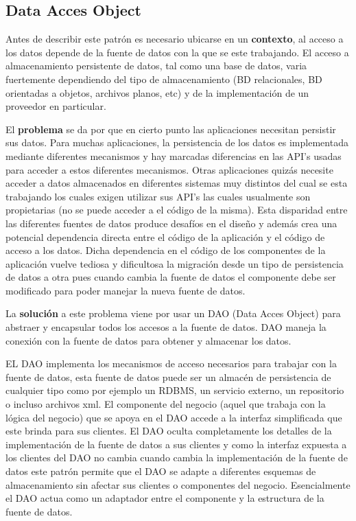 \subsection{Data Acces Object}\label{jdbgm:dao}
Antes de describir este patrón es necesario ubicarse en un \textbf{contexto}, al acceso a los datos depende de la fuente de datos con la que se este trabajando. El acceso a almacenamiento persistente de datos, tal como una base de datos, varia fuertemente dependiendo del tipo de almacenamiento (BD relacionales, BD orientadas a objetos, archivos planos, etc) y de la implementación de un proveedor en particular.

El \textbf{problema} se da por que en cierto punto las aplicaciones necesitan persistir sus datos. Para muchas aplicaciones, la persistencia de los datos es implementada mediante diferentes mecanismos y hay marcadas diferencias en las API's usadas para acceder a estos diferentes mecanismos. Otras aplicaciones quizás necesite acceder a datos almacenados en diferentes sistemas muy distintos del cual se esta trabajando los cuales exigen utilizar sus API's las cuales usualmente son propietarias (no se puede acceder a el código de la misma). Esta disparidad entre las diferentes fuentes de datos produce desafíos en el diseño y además crea una potencial dependencia directa entre el código de la aplicación y el código de acceso a los datos. Dicha dependencia en el código de los componentes de la aplicación vuelve tediosa y dificultosa la migración desde un tipo de persistencia de datos a otra pues cuando cambia la fuente de datos el componente debe ser modificado para poder manejar la nueva fuente de datos.

La \textbf{solución} a este problema viene por usar un DAO (Data Acces Object) para abstraer y encapsular todos los accesos a la fuente de datos. DAO maneja la conexión con la fuente de datos para obtener y almacenar los datos.

EL DAO implementa los mecanismos de acceso necesarios para trabajar con la fuente de datos, esta fuente de datos puede ser un almacén de persistencia de cualquier tipo como por ejemplo un RDBMS, un servicio externo, un repositorio o incluso archivos xml. El componente del negocio (aquel que trabaja con la lógica del negocio) que se apoya en el DAO accede a la interfaz simplificada que este brinda para sus clientes. El DAO oculta completamente los detalles de la implementación de la fuente de datos a sus clientes y como la interfaz expuesta a los clientes del DAO no cambia cuando cambia la implementación de la fuente de datos este patrón permite que el DAO se adapte a diferentes esquemas de almacenamiento sin afectar sus clientes o componentes del negocio. Esencialmente el DAO actua como un adaptador entre el componente y la estructura de la fuente de datos.

